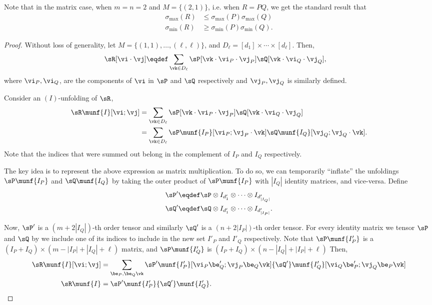 Note that in the matrix case, when $m = n = 2$ and $M=\{(2,1)\}$, i.e.
when $R = P Q$, we get the standard result that 
\begin{align}
\sigma_{\max}(R) &\le \sigma_{\max}(P) \sigma_{\max}(Q) \\
\sigma_{\min}(R) &\ge \sigma_{\min}(P) \sigma_{\min}(Q) \label{eqn:matrix-singular}.
\end{align}

\begin{proof}
  Without loss of generality, let $M = \{(1,1), \ldots, (\ell,\ell)\}$,
  and $D_\ell = [d_1] \times \cdots \times [d_\ell]$. 
  Then, 
  \begin{align*}
    \sR[\vi\cdot\vj] &\eqdef \sum_{\vk \in D_\ell} \sP[\vk\cdot\vi_P\cdot\vj_P] \sQ[\vk\cdot\vi_Q\cdot\vj_Q],
  \end{align*}
  where $\vi_P, \vi_Q$, are the components of $\vi$ in $\sP$ and $\sQ$
  respectively and $\vj_P, \vj_Q$ is similarly defined.

Consider an $(I)$-unfolding of $\sR$,
  \begin{align*}
    \sR\munf{I}[\vi;\vj] 
       &= \sum_{\vk \in D_\ell} \sP[\vk\cdot \vi_P \cdot \vj_P] \sQ[\vk\cdot \vi_Q \cdot \vj_Q] \\
       &= \sum_{\vk \in D_\ell} \sP\munf{I_P}[\vi_P; \vj_P \cdot \vk] \sQ\munf{I_Q}[\vj_Q; \vj_Q \cdot \vk].
  \end{align*}
Note that the indices that were summed out belong in the complement of $I_P$ and $I_Q$ respectively.

The key idea is to represent the above expression as matrix multiplication.
To do so, we can temporarily ``inflate'' the unfoldings $\sP\munf{I_P}$
  and $\sQ\munf{I_Q}$ by taking the outer product of $\sP\munf{I_P}$ with
  $|I_Q|$ identity matrices, and vice-versa. Define 
\begin{align*}
  \sP' &\eqdef \sP \otimes I_{d'_1} \otimes \cdots \otimes I_{d'_{|I_Q|}} \\
  \sQ' &\eqdef \sQ \otimes I_{d'_1} \otimes \cdots \otimes I_{d'_{|I_P|}}.
\end{align*}

Now, $\sP'$ is a $(m + 2 |I_Q|)$-th order tensor and similarly $\sQ'$
  is a $(n + 2 |I_P|)$-th order tensor. 
For every identity matrix we tensor $\sP$ and $\sQ$ by we include one of
  its indices to include in the new set $I'_P$ and $I'_Q$ respectively.
  Note that $\sP\munf{I'_P}$ is a $(I_P + I_Q)\times (m - |I_P| + |I_Q| + \ell)$ matrix, and 
$\sP\munf{I'_Q}$ is $(I_P + I_Q) \times (n - |I_Q| + |I_P| + \ell)$
Then,
\begin{align*}
    \sR\munf{I}[\vi;\vj] 
    &= \sum_{\be_P, \be_Q \vk}
    {\sP'}\munf{I'_P}[\vi_P\be'_Q; \vj_P \be_Q \vk]  
    {\sQ'}\munf{I'_Q}[\vi_Q\be'_P; \vj_Q \be_P \vk] \\
    \sR\munf{I} &= {\sP'}\munf{I'_P} {\sQ'}\munf{I'_Q}.
\end{align*}


\end{proof}
